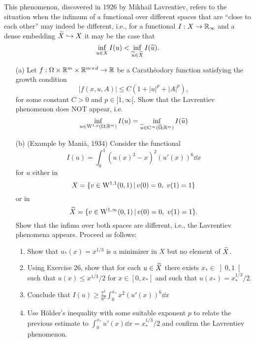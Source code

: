 \documentclass[12pt,a4paper]{article}
\begin{document}
 This phenomenon, discovered in 1926 by Mikhail Lavrentiev, 
refers to the situation when the infimum of a functional over different spaces
that are ``close to each other'' may 
indeed be different, i.e., for a functional $I:X\to {\mathbb R}_{\infty}$ 
and a dense embedding $\widetilde X\hookrightarrow X$ it may be the case that
\[
\inf_{u\in X} I(u) < \inf_{\widetilde u \in \widetilde X} I(\widetilde u).
\]
\begin{itemize}
    \item[(a)] Let $f:\Omega\times {\mathbb R}^m\times {\mathbb R}^{m\times d} \to {\mathbb R}$ be a Carath\'eodory function
    satisfying the growth condition
    \[
        |f(x,u,A)| \leq C(1+|u|^p +|A|^p),
    \]
    for some constant $C>0$ and $p\in[1,\infty[$. Show that the Lavrentiev phenomenon does NOT appear, i.e.\
    \[\inf_{u\in {\mathrm W}^{1,p}(\Omega;{\mathbb R}^m)} I(u) = \inf_{\widetilde u\in {\mathrm C}^\infty(\overline\Omega;{\mathbb R}^m)} I(\widetilde u)\]
    \item[(b)] (Example by Mani\`a, 1934) Consider the functional
    \[
        I(u) = \int_0^1 (u(x)^3-x)^2(u'(x))^6\dd x
    \]
    for $u$ either in 
    \[
    X=\{ v\in {\mathrm W}^{1,1}(0,1)\,|\,v(0)=0,~v(1) =1\}
    \]
    or in
    \[
    \widetilde X=\{ v\in {\mathrm W}^{1,\infty}(0,1)\,|\,v(0)=0,~v(1) =1\}.
    \]  
    Show that the infima over both spaces are different, i.e., 
    the Lavrentiev phenomena appears. Proceed as follows:
    \begin{enumerate}
        \item Show that $u_*(x) = x^{1/3}$ is a minimizer in $X$ but no element of $\widetilde X$.
        \item Using Exercise 26, show that for each $u\in \widetilde X$ there exists $x_*\in\left]0,1\right[$ such that $u(x)\leq x^{1/3}/2$ for $x\in [0,x_*]$ and such that $u(x_*)= x_*^{1/3}/2$.
        \item Conclude that $I(u)\geq \frac{7^2}{8^2}\int_0^{x_*}x^2(u'(x))^6\dd x$
        \item Use H\"older's inequality with some suitable exponent $p$ to relate the previous estimate to $\int_0^{x_*} u'(x)\dd x = x_*^{1/3}/2$ and confirm the Lavrentiev phenomenon.
    \end{enumerate}
\end{itemize}
\end{document}
